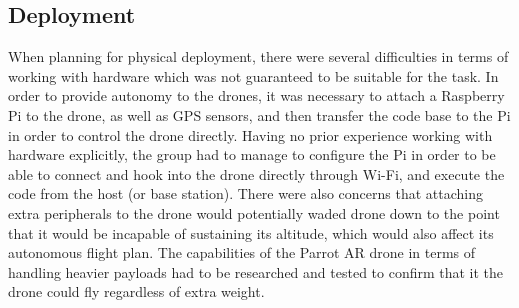 		\subsection{Deployment}
When planning for physical deployment, there were several difficulties in terms of working with hardware which was not guaranteed to be suitable for the task. In order to provide autonomy to the drones, it was necessary to attach a Raspberry Pi to the drone, as well as GPS sensors, and then transfer the code base to the Pi in order to control the drone directly. Having no prior experience working with hardware explicitly, the group had to manage to configure the Pi in order to be able to connect and hook into the drone directly through Wi-Fi, and execute the code from the host (or base station). There were also concerns that attaching extra peripherals to the drone would potentially waded drone down to the point that it would be incapable of sustaining its altitude, which would also affect its autonomous flight plan. The capabilities of the Parrot AR drone in terms of handling heavier payloads had to be researched and tested to confirm that it the drone could fly regardless of extra weight.


